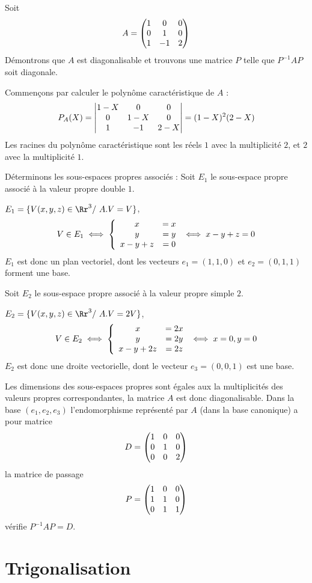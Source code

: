 \documentclass[class=report,crop=false]{standalone}
\begin{document}
\begin{exemple}
Soit $$A=\left(\begin{matrix}1&0&0\cr0&1&0\cr1&-1&2\end{matrix}\right)$$
Démontrons que $A$ est diagonalisable et trouvons une matrice $P$ telle que $P^{-1}AP$ soit diagonale.

Commençons par calculer le polynôme caractéristique de $A$ :
$$P_A(X)=\left|\begin{matrix}1-X&0&0\cr 0&1-X&0\cr1&-1&2-X\end{matrix}\right|=(1-X)^2(2-X)$$
Les racines du polynôme caractéristique sont les réels $1$ avec la multiplicité $2$, et $2$ avec la multiplicité $1$.

Déterminons les sous-espaces propres associés : Soit $E_1$ le sous-espace propre associé à la valeur propre double $1$.

$E_1=\{V(x,y,z)\in\Rr^3/\ A.V=V\}$, 
$$V\in E_1\iff \left\{\begin{array}{cc}x&=x\cr y&=y\cr x-y+z&=0\end{array}\right.\iff x-y+z=0$$
$E_1$ est donc un plan vectoriel, dont les vecteurs $e_1=(1,1,0)$ et $e_2=(0,1,1)$ forment une base.

Soit $E_2$ le sous-espace propre associé à la valeur propre simple $2$.

$E_2=\{V(x,y,z)\in\Rr^3/\ A.V=2V\}$, 
$$V\in E_2\iff \left\{\begin{array}{cc}x&=2x\cr y&=2y\cr x-y+2z&=2z\end{array}\right.\iff x=0, y=0$$
$E_2$ est donc une droite vectorielle, dont le vecteur $e_3=(0,0,1)$ est une base.

Les dimensions des sous-espaces propres sont égales aux la multiplicités des valeurs propres correspondantes, la matrice $A$ est donc diagonalisable.
Dans la base $(e_1, e_2, e_3)$ l'endomorphisme représenté par $A$ (dans la base canonique) a pour matrice
$$D=\left(\begin{matrix}1&0&0\cr 0&1&0\cr 0&0&2\end{matrix}\right)$$
la matrice de passage $$P=\left(\begin{matrix}1&0&0\cr 1&1&0\cr 0&1&1\end{matrix}\right)$$ vérifie $P^{-1}AP=D$.
\end{exemple}



\section{Trigonalisation} 
\end{document}
